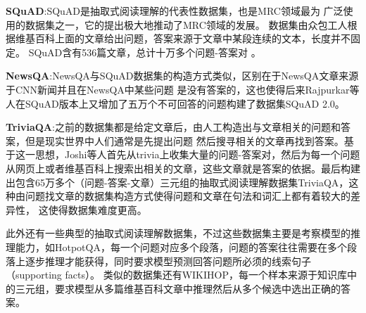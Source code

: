 \textbf{SQuAD}:\quad SQuAD是抽取式阅读理解的代表性数据集，也是MRC领域最为
广泛使用的数据集之一，它的提出极大地推动了MRC领域的发展。
数据集由众包工人根据维基百科上面的文章给出问题，答案来源于文章中某段连续的文本，长度并不固定。
SQuAD含有536篇文章，总计十万多个问题-答案对
。

\textbf{NewsQA}:\quad NewsQA与SQuAD数据集的构造方式类似，区别在于NewsQA文章来源于CNN新闻并且在NewsQA中某些问题
是没有答案的，这也使得后来Rajpurkar等人在SQuAD版本上又增加了五万个不可回答的问题构建了数据集SQuAD 2.0。

\textbf{TriviaQA}:\quad 之前的数据集都是给定文章后，由人工构造出与文章相关的问题和答案，但是现实世界中人们通常是先提出问题
然后搜寻相关的文章再找到答案。基于这一思想，Joshi等人首先从trivia上收集大量的问题-答案对，然后为每一个问题从网页上或者维基百科上搜索出相关的文章，这些文章就是答案的依据。最后构建出包含65万多个（问题-答案-文章）三元组的抽取式阅读理解数据集TriviaQA，这种由问题找文章的数据集构造方式使得问题和文章在句法和词汇上都有着较大的差异性，
这使得数据集难度更高。

此外还有一些典型的抽取式阅读理解数据集，不过这些数据集主要是考察模型的推理能力，如HotpotQA，每一个问题对应多个段落，问题的答案往往需要在多个段落上逐步推理才能获得，同时要求模型预测回答问题所必须的线索句子（supporting facts）。
类似的数据集还有WIKIHOP，每一个样本来源于知识库中的三元组，要求模型从多篇维基百科文章中推理然后从多个候选中选出正确的答案。

